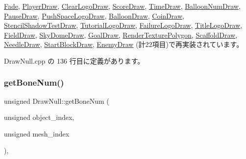 \mbox{\hyperlink{class_fade_a84a9e688650ac500e03cde74ff0210b8}{Fade}}, \mbox{\hyperlink{class_player_draw_a8b9e8caa6bea7295f58a0aaddeb9458b}{Player\+Draw}}, \mbox{\hyperlink{class_clear_logo_draw_ab018f370071f370ae7016d8ee402c456}{Clear\+Logo\+Draw}}, \mbox{\hyperlink{class_score_draw_a799e71943140a264cedba6002308b976}{Score\+Draw}}, \mbox{\hyperlink{class_time_draw_a1d5bd7b20e71eb37f3f0b225079cc9b3}{Time\+Draw}}, \mbox{\hyperlink{class_balloon_num_draw_ae4477e10f6ac54beb64b1f2f85f6d2d1}{Balloon\+Num\+Draw}}, \mbox{\hyperlink{class_pause_draw_a84a0b8965acd5d9a6021d4a4776a770f}{Pause\+Draw}}, \mbox{\hyperlink{class_push_space_logo_draw_a647dddefc43d66cb3c720ee8fbb6a783}{Push\+Space\+Logo\+Draw}}, \mbox{\hyperlink{class_balloon_draw_aff3ee0684a7c027878915e332ca895ee}{Balloon\+Draw}}, \mbox{\hyperlink{class_coin_draw_ac7d91fecb6845cebe276eb81a4953563}{Coin\+Draw}}, \mbox{\hyperlink{class_stencil_shadow_test_draw_abb5f9445b7d94c213a3751fa57e36643}{Stencil\+Shadow\+Test\+Draw}}, \mbox{\hyperlink{class_tutorial_logo_draw_aa808cfb8bc59d58bbd698a195603429f}{Tutorial\+Logo\+Draw}}, \mbox{\hyperlink{class_failure_logo_draw_a8ee20e1697bbbaf7f41c18334830488a}{Failure\+Logo\+Draw}}, \mbox{\hyperlink{class_title_logo_draw_a01e4cb21d580bac86a226fa2e35bf4a3}{Title\+Logo\+Draw}}, \mbox{\hyperlink{class_field_draw_a1915497654d079074dbd3e058db06a78}{Field\+Draw}}, \mbox{\hyperlink{class_sky_dome_draw_a42364ea42618cbab588d55050edfe95a}{Sky\+Dome\+Draw}}, \mbox{\hyperlink{class_goal_draw_a554c826d7a4534ee489dfe18edf7ee0e}{Goal\+Draw}}, \mbox{\hyperlink{class_render_texture_polygon_a95e688cae107312649c1fb7965e2ba6b}{Render\+Texture\+Polygon}}, \mbox{\hyperlink{class_scaffold_draw_ae70204344a061ff43744a116da64b013}{Scaffold\+Draw}}, \mbox{\hyperlink{class_needle_draw_a9fb9ee239ee432f2fc3235acbd24647c}{Needle\+Draw}}, \mbox{\hyperlink{class_start_block_draw_a280430a290cf9ea32117f0c460a0f775}{Start\+Block\+Draw}}, \mbox{\hyperlink{class_enemy_draw_a20a23c1c5fd5e510d15e8ca27aabd821}{Enemy\+Draw}} (計22項目)で再実装されています。



 Draw\+Null.\+cpp の 136 行目に定義があります。

\mbox{\label{class_draw_null_a74aee63e6146b7256b80610abfb3eabb}} 
\subsubsection{\texorpdfstring{get\+Bone\+Num()}{getBoneNum()}}
{\footnotesize\ttfamily unsigned Draw\+Null\+::get\+Bone\+Num (\begin{DoxyParamCaption}\item[{unsigned}]{object\+\_\+index,  }\item[{unsigned}]{mesh\+\_\+index }\end{DoxyParamCaption})\hspace{0.3cm}{\ttfamily [override]}, {\ttfamily [virtual]}}



